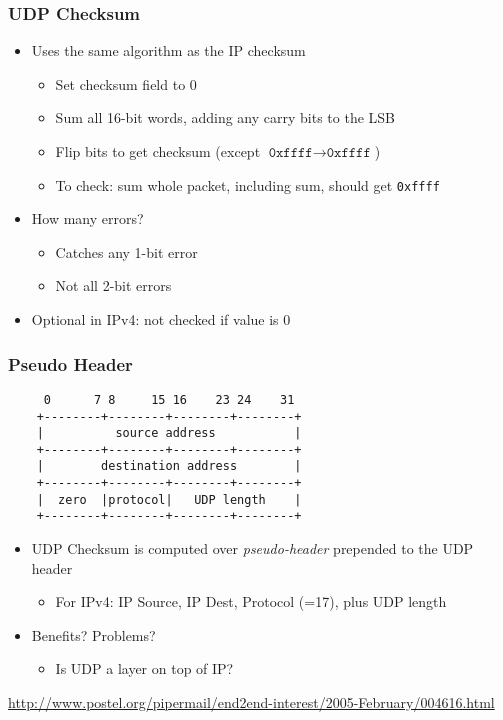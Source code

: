 \subsubsection{UDP Checksum}
\begin{itemize}[nosep]
    \item Uses the same algorithm as the IP checksum
          \begin{itemize}
              \item Set checksum field to 0
              \item Sum all 16-bit words, adding any carry bits to the LSB
              \item Flip bits to get checksum (except $\texttt{0xffff}\to\texttt{0xffff}$)
              \item To check: sum whole packet, including sum, should get \texttt{0xffff}
          \end{itemize}
    \item How many errors?
          \begin{itemize}[nosep]
              \item Catches any 1-bit error
              \item Not all 2-bit errors
          \end{itemize}
    \item Optional in IPv4: not checked if value is 0
\end{itemize}
\subsubsection{Pseudo Header}
\begin{verbatim}
     0      7 8     15 16    23 24    31
    +--------+--------+--------+--------+
    |          source address           |
    +--------+--------+--------+--------+
    |        destination address        |
    +--------+--------+--------+--------+
    |  zero  |protocol|   UDP length    |
    +--------+--------+--------+--------+
\end{verbatim}
\begin{itemize}[nosep]
    \item UDP Checksum is computed over \emph{pseudo-header} prepended to the UDP header
          \begin{itemize}[nosep]
              \item For IPv4: IP Source, IP Dest, Protocol (=17), plus UDP length
          \end{itemize}
    \item Benefits? Problems?
          \begin{itemize}[nosep]
              \item Is UDP a layer on top of IP?
          \end{itemize}
\end{itemize}
\url{http://www.postel.org/pipermail/end2end-interest/2005-February/004616.html}

